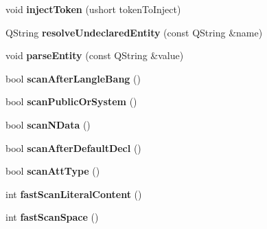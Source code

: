 \begin{DoxyCompactItemize}
\item 
\mbox{\label{class_xml_stream_reader_private_a97e8d9f5bcc535d6e5c183d589c90755}} 
void {\bfseries inject\+Token} (ushort token\+To\+Inject)
\item 
\mbox{\label{class_xml_stream_reader_private_a74859a3a96996b96a6ba318ab99bfad0}} 
Q\+String {\bfseries resolve\+Undeclared\+Entity} (const Q\+String \&name)
\item 
\mbox{\label{class_xml_stream_reader_private_aa0c1fef7b5fc89552c259bbc44546d6e}} 
void {\bfseries parse\+Entity} (const Q\+String \&value)
\item 
\mbox{\label{class_xml_stream_reader_private_a9564599bbf5003b13f135e48fe37b8ab}} 
bool {\bfseries scan\+After\+Langle\+Bang} ()
\item 
\mbox{\label{class_xml_stream_reader_private_a6e320e0a1dab9eafe10bc7ea784669de}} 
bool {\bfseries scan\+Public\+Or\+System} ()
\item 
\mbox{\label{class_xml_stream_reader_private_ab332fd34b56c1cbf1355ee4272e3f82e}} 
bool {\bfseries scan\+N\+Data} ()
\item 
\mbox{\label{class_xml_stream_reader_private_ad9678b123ce1ace9789f6b8ccfc52c9d}} 
bool {\bfseries scan\+After\+Default\+Decl} ()
\item 
\mbox{\label{class_xml_stream_reader_private_a0232349a09c7565dfab6fcf0902e321c}} 
bool {\bfseries scan\+Att\+Type} ()
\item 
\mbox{\label{class_xml_stream_reader_private_aa46a4827371351a8bd57f1336eecc5a3}} 
int {\bfseries fast\+Scan\+Literal\+Content} ()
\item 
\mbox{\label{class_xml_stream_reader_private_a5f03560761277295b4a5643f42755df7}} 
int {\bfseries fast\+Scan\+Space} ()
\item 

\end{DoxyCompactItemize}
